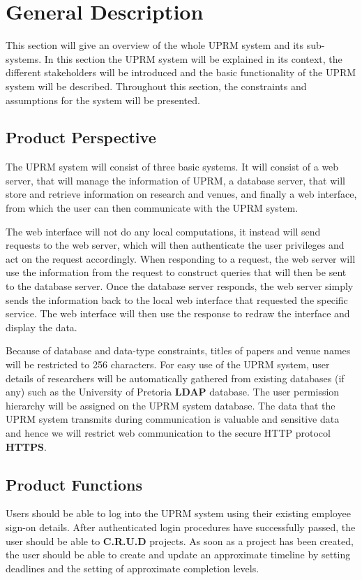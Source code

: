
\section{General Description}
This section will give an overview of the whole UPRM system and its sub-systems.
In this section the UPRM system will be explained in its context, the different stakeholders will be introduced and the basic functionality of the UPRM system will be described. Throughout this section, the constraints and assumptions for the system will be presented.

	\subsection{Product Perspective}
		The UPRM system will consist of three basic systems. It will consist of a web server, that will manage the information of UPRM, a database server, that will store and retrieve information on research and venues, and finally a web interface, from which the user can then communicate with the UPRM system.
		
		The web interface will not do any local computations, it instead will send requests to the web server, which will then authenticate the user privileges and act on the request accordingly. When responding to a request, the web server will use the information from the request to construct queries that will then be sent to the database server. Once the database server responds, the web server simply sends the information back to the local web interface that requested the specific service. The web interface will then use the response to redraw the interface and display the data.
		
		Because of database and data-type constraints, titles of papers and venue names will be restricted to 256 characters. For easy use of the UPRM system, user details of researchers will be automatically gathered from existing databases (if any) such as the University of Pretoria \textbf{LDAP}\cite{LDAP:rfc4511} database. The user permission hierarchy will be assigned on the UPRM system database. The data that the UPRM system transmits during communication is valuable and sensitive data and hence we will restrict web communication to the secure HTTP protocol \textbf{HTTPS}\cite{Google:HTTPS}.
	
	\subsection{Product Functions}
		Users should be able to log into the UPRM system using their existing employee sign-on details. After authenticated login procedures have successfully passed, the user should be able to \textbf{C.R.U.D} projects. As soon as a project has been created, the user should be able to create and update an approximate timeline by setting deadlines and the setting of approximate completion levels.
		
